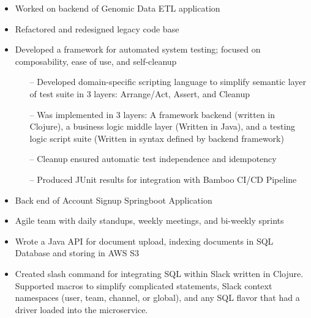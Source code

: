 \documentclass[10pt,a4paper]{altacv}
\begin{document}


\begin{fullwidth}
\makecvheader
\end{fullwidth}

\begin{quote}

\end{quote}


\begin{itemize}
    \item Worked on backend of Genomic Data ETL application
    \item Refactored and redesigned legacy code base
    \item Developed a framework for automated system testing; focused on composability, ease of use, and self-cleanup
    \begin{itemize}
      \item[--] Developed domain-specific scripting language to simplify semantic layer of test suite in 3 layers: Arrange/Act, Assert, and Cleanup
      \item[--] Was implemented in 3 layers: A framework backend (written in Clojure), a business logic middle layer (Written in Java), and a testing logic script suite (Written in syntax defined by backend framework)
      \item[--] Cleanup ensured automatic test independence and idempotency
      \item[--] Produced JUnit results for integration with Bamboo CI/CD Pipeline
    \end{itemize}
\end{itemize}

\bigskip


\divider

\begin{itemize}
    \item  Back end of Account Signup Springboot Application
    \item  Agile team with daily standups, weekly meetings, and bi-weekly sprints
    \item Wrote a Java API for document upload, indexing documents in SQL Database and storing in AWS S3
    \item Created slash command for integrating SQL within Slack written in Clojure. Supported macros to simplify complicated statements, Slack context namespaces (user, team, channel, or global), and any SQL flavor that had a driver loaded into the microservice.
\end{itemize}
\end{document}
